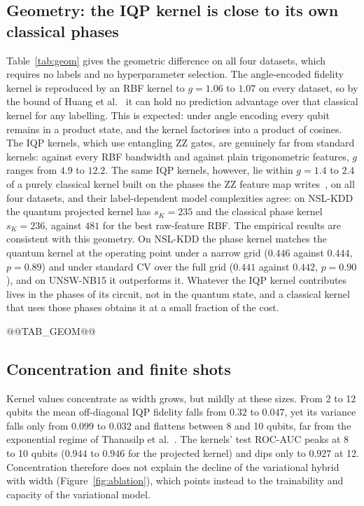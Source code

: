\subsection{Geometry: the IQP kernel is close to its own classical phases}\label{sec:kgeom}
Table~\ref{tab:geom} gives the geometric difference on all four datasets, which requires no labels and no
hyperparameter selection. The angle-encoded fidelity kernel is reproduced by an RBF kernel to $g=1.06$ to
$1.07$ on every dataset, so by the bound of Huang et al.~\cite{huang2021power} it can hold no prediction
advantage over that classical kernel for any labelling. This is expected: under angle encoding every qubit
remains in a product state, and the kernel factorises into a product of cosines. The IQP kernels, which
use entangling ZZ gates, are genuinely far from standard kernels: against every RBF bandwidth and against
plain trigonometric features, $g$ ranges from $4.9$ to $12.2$. The same IQP kernels, however, lie within
$g=1.4$ to $2.4$ of a purely classical kernel built on the phases the ZZ feature map
writes~\cite{havlicek2019supervised}, on all four datasets, and their label-dependent model complexities
agree: on NSL-KDD the quantum projected kernel has $s_K=235$ and the classical phase kernel $s_K=236$, against
$481$ for the best raw-feature RBF. The empirical results are consistent with this geometry. On NSL-KDD the
phase kernel matches the quantum kernel at the operating point under a narrow grid ($0.446$ against
$0.444$, $p=0.89$) and under standard CV over the full grid ($0.441$ against $0.442$, $p=0.90$), and on
UNSW-NB15 it outperforms it. Whatever the IQP kernel contributes lives in the phases of its circuit, not
in the quantum state, and a classical kernel that uses those phases obtains it at a small fraction of the
cost.

@@TAB_GEOM@@

\subsection{Concentration and finite shots}\label{sec:kshots}
Kernel values concentrate as width grows, but mildly at these sizes. From 2 to 12 qubits the mean
off-diagonal IQP fidelity falls from $0.32$ to $0.047$, yet its variance falls only from $0.099$ to $0.032$
and flattens between 8 and 10 qubits, far from the exponential regime of Thanasilp
et al.~\cite{thanasilp2024concentration}. The kernels' test ROC-AUC peaks at 8 to 10 qubits ($0.944$ to
$0.946$ for the projected kernel) and dips only to $0.927$ at 12. Concentration therefore does not explain
the decline of the variational hybrid with width (Figure~\ref{fig:ablation}), which points instead to the
trainability and capacity of the variational model.

